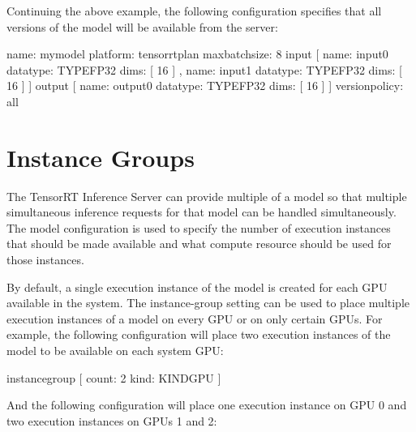 \documentclass[letterpaper,10pt,english]{sphinxmanual}
\begin{document}
Continuing the above example, the following configuration specifies
that all versions of the model will be available from the server:

\begin{sphinxVerbatim}[commandchars=\\\{\}]
name: \PYGZdq{}mymodel\PYGZdq{}
platform: \PYGZdq{}tensorrt\PYGZus{}plan\PYGZdq{}
max\PYGZus{}batch\PYGZus{}size: 8
input [
  \PYGZob{}
    name: \PYGZdq{}input0\PYGZdq{}
    data\PYGZus{}type: TYPE\PYGZus{}FP32
    dims: [ 16 ]
  \PYGZcb{},
  \PYGZob{}
    name: \PYGZdq{}input1\PYGZdq{}
    data\PYGZus{}type: TYPE\PYGZus{}FP32
    dims: [ 16 ]
  \PYGZcb{}
]
output [
  \PYGZob{}
    name: \PYGZdq{}output0\PYGZdq{}
    data\PYGZus{}type: TYPE\PYGZus{}FP32
    dims: [ 16 ]
  \PYGZcb{}
]
version\PYGZus{}policy: \PYGZob{} all \PYGZob{} \PYGZcb{}\PYGZcb{}
\end{sphinxVerbatim}


\section{Instance Groups}
\label{\detokenize{model_configuration:instance-groups}}\label{\detokenize{model_configuration:section-instance-groups}}
The TensorRT Inference Server can provide multiple {\hyperref[\detokenize{architecture:section-concurrent-model-execution}]{}} of a model so that
multiple simultaneous inference requests for that model can be handled
simultaneously. The model configuration  is used to specify the
number of execution instances that should be made available and what
compute resource should be used for those instances.

By default, a single execution instance of the model is created for
each GPU available in the system. The instance-group setting can be
used to place multiple execution instances of a model on every GPU or
on only certain GPUs. For example, the following configuration will
place two execution instances of the model to be available on each
system GPU:

\begin{sphinxVerbatim}[commandchars=\\\{\}]
instance\PYGZus{}group [
  \PYGZob{}
    count: 2
    kind: KIND\PYGZus{}GPU
  \PYGZcb{}
]
\end{sphinxVerbatim}

And the following configuration will place one execution instance on
GPU 0 and two execution instances on GPUs 1 and 2:
\end{document}
